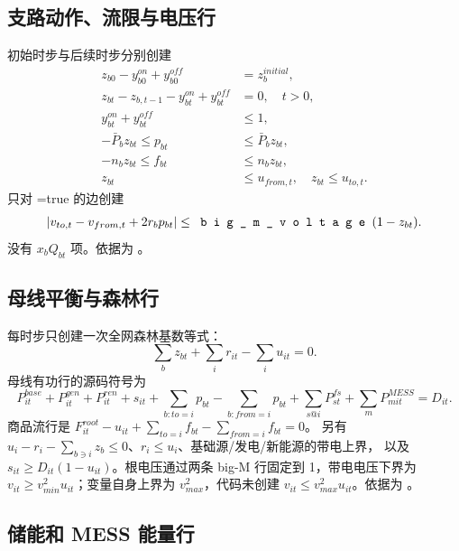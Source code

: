 \subsection{支路动作、流限与电压行}

初始时步与后续时步分别创建
\begin{align}
 z_{b0}-y^{on}_{b0}+y^{off}_{b0}&=z_b^{initial},\\
 z_{bt}-z_{b,t-1}-y^{on}_{bt}+y^{off}_{bt}&=0,\quad t>0,\\
 y^{on}_{bt}+y^{off}_{bt}&\le1,\\
 -\bar P_bz_{bt}\le p_{bt}&\le\bar P_bz_{bt},\\
 -n_bz_{bt}\le f_{bt}&\le n_bz_{bt},\\
 z_{bt}&\le u_{from,t},\quad z_{bt}\le u_{to,t}.
\end{align}
只对 =true 的边创建
\begin{equation}
 |v_{to,t}-v_{from,t}+2r_bp_{bt}|\le
 \fld{big\_m\_voltage}(1-z_{bt}).
\end{equation}
没有 $x_bQ_{bt}$ 项。依据为
。

\subsection{母线平衡与森林行}

每时步只创建一次全网森林基数等式：
\begin{equation}
 \sum_bz_{bt}+\sum_ir_{it}-\sum_iu_{it}=0.
\end{equation}
母线有功行的源码符号为
\begin{equation}
 P^{base}_{it}+P^{gen}_{it}+P^{ren}_{it}+s_{it}
 +\sum_{b:to=i}p_{bt}-\sum_{b:from=i}p_{bt}
 +\sum_{s@i}P^{fs}_{st}+\sum_mP^{MESS}_{mit}=D_{it}.
\end{equation}
商品流行是
$F^{root}_{it}-u_{it}+\sum_{to=i}f_{bt}-\sum_{from=i}f_{bt}=0$。
另有 $u_i-r_i-\sum_{b\ni i}z_b\le0$、$r_i\le u_i$、基础源/发电/新能源的带电上界，
以及 $s_{it}\ge D_{it}(1-u_{it})$。根电压通过两条 big-M 行固定到 1，带电电压下界为
$v_{it}\ge v_{min}^{2}u_{it}$；变量自身上界为 $v_{max}^{2}$，代码未创建
$v_{it}\le v_{max}^{2}u_{it}$。依据为
。

\subsection{储能和 MESS 能量行}

